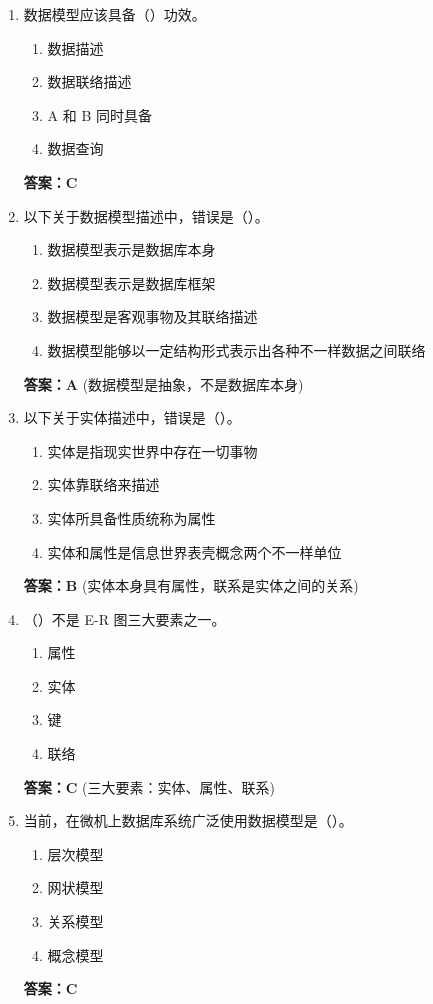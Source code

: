 \documentclass[12pt, a4paper]{article}
\begin{document}
\begin{enumerate}[label=\arabic*.]
    \item 数据模型应该具备（\quad）功效。
    \begin{enumerate}
        \item 数据描述
        \item 数据联络描述
        \item A 和 B 同时具备
        \item 数据查询
    \end{enumerate}
    \textbf{答案：C}

    \item 以下关于数据模型描述中，错误是（\quad）。
    \begin{enumerate}
        \item 数据模型表示是数据库本身
        \item 数据模型表示是数据库框架
        \item 数据模型是客观事物及其联络描述
        \item 数据模型能够以一定结构形式表示出各种不一样数据之间联络
    \end{enumerate}
    \textbf{答案：A} (数据模型是抽象，不是数据库本身)

    \item 以下关于实体描述中，错误是（\quad）。
    \begin{enumerate}
        \item 实体是指现实世界中存在一切事物
        \item 实体靠联络来描述
        \item 实体所具备性质统称为属性
        \item 实体和属性是信息世界表壳概念两个不一样单位
    \end{enumerate}
    \textbf{答案：B} (实体本身具有属性，联系是实体之间的关系)

    \item （\quad）不是 E-R 图三大要素之一。
    \begin{enumerate}
        \item 属性
        \item 实体
        \item 键
        \item 联络
    \end{enumerate}
    \textbf{答案：C} (三大要素：实体、属性、联系)

    \item 当前，在微机上数据库系统广泛使用数据模型是（\quad）。
    \begin{enumerate}
        \item 层次模型
        \item 网状模型
        \item 关系模型
        \item 概念模型
    \end{enumerate}
    \textbf{答案：C}


\end{enumerate}
\end{document}
